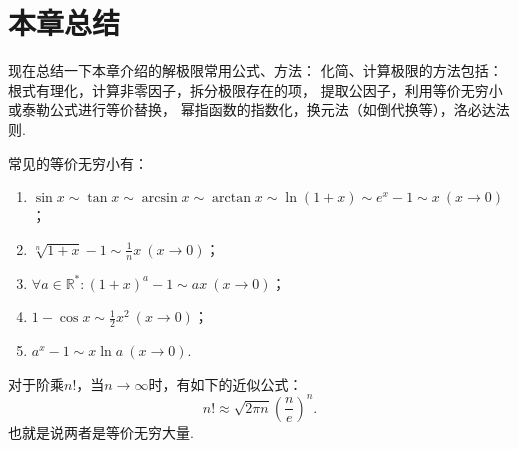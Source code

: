 \section{本章总结}
现在总结一下本章介绍的解极限常用公式、方法：
化简、计算极限的方法包括：
根式有理化，计算非零因子，拆分极限存在的项，
提取公因子，利用等价无穷小或泰勒公式进行等价替换，
幂指函数的指数化，换元法（如倒代换等），洛必达法则.

常见的等价无穷小有：
\begin{enumerate}
	\item \(\sin x \sim \tan x \sim \arcsin x \sim \arctan x \sim \ln(1+x) \sim e^x-1 \sim x\ (x\to0)\)；
	\item \(\sqrt[n]{1+x} - 1 \sim \frac{1}{n} x\ (x\to0)\)；
	\item \(\forall a\in\mathbb{R}^*: (1+x)^a-1 \sim ax\ (x\to0)\)；
	\item \(1 - \cos x \sim \frac{1}{2} x^2\ (x\to0)\)；
	\item \(a^x - 1 \sim x \ln a\ (x\to0)\).
\end{enumerate}

\begin{theorem}[斯特林公式]\label{theorem:极限.斯特林公式}
对于阶乘\(n!\)，当\(n\to\infty\)时，有如下的近似公式：\[
n! \approx \sqrt{2 \pi n} \left( \frac{n}{e} \right)^n.
\]也就是说两者是等价无穷大量.
\end{theorem}

